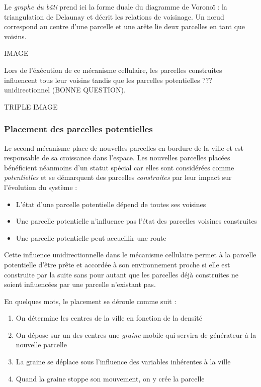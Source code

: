 \documentclass[12pt]{article}
\begin{document}
Le \textit{graphe du bâti} prend ici la forme duale du diagramme de
Voronoï : la triangulation de Delaunay et décrit les relations de
voisinage. Un n\oe ud correspond au centre d'une parcelle et une arête
lie deux parcelles en tant que voisins.

IMAGE

Lors de l'éxécution de ce mécanisme cellulaire, les parcelles
construites influencent tous leur voisins tandis que les parcelles
potentielles ??? unidirectionnel (BONNE QUESTION).

TRIPLE IMAGE

\subsubsection{Placement des parcelles potentielles}

Le second mécanisme place de nouvelles parcelles en bordure de la
ville et est responsable de sa croissance dans l'espace. Les nouvelles
parcelles placées bénéficient néanmoins d'un statut spécial car elles
sont considérées comme \textit{potentielles} et se démarquent des
parcelles \textit{construites} par leur impact sur l'évolution du
système :

\begin{itemize}
\item{L'état d'une parcelle potentielle dépend de toutes ses voisines}
\item{Une parcelle potentielle n'influence pas l'état des parcelles
  voisines construites}
\item{Une parcelle potentielle peut accueillir une route}
\end{itemize}

Cette influence unidirectionnelle dans le mécanisme cellulaire permet
à la parcelle potentielle d'être prête et accordée à son environnement
proche si elle est construite par la suite sans pour autant que les
parcelles déjà construites ne soient influencées par une parcelle
n'existant pas.

En quelques mots, le placement se déroule comme suit :

\begin{enumerate}
\item{On détermine les centres de la ville en fonction de la densité}
\item{On dépose sur un des centres une \textit{graine} mobile qui
  servira de générateur à la nouvelle parcelle}
\item{La graine se déplace sous l'influence des variables inhérentes à
  la ville}
\item{Quand la graine stoppe son mouvement, on y crée la parcelle}
\end{enumerate}
\end{document}
